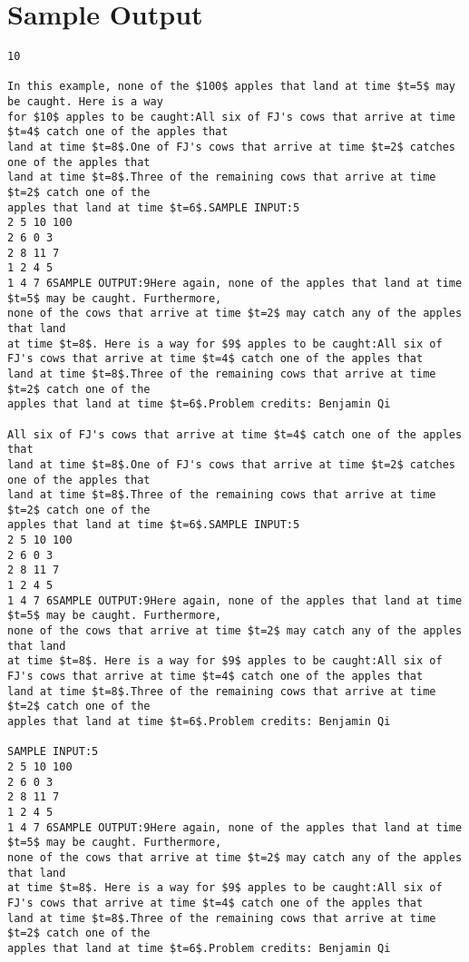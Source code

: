 \documentclass[12pt]{article}
\begin{document}
\section*{Sample Output}
\begin{verbatim}
10

In this example, none of the $100$ apples that land at time $t=5$ may be caught. Here is a way
for $10$ apples to be caught:All six of FJ's cows that arrive at time $t=4$ catch one of the apples that
land at time $t=8$.One of FJ's cows that arrive at time $t=2$ catches one of the apples that
land at time $t=8$.Three of the remaining cows that arrive at time $t=2$ catch one of the
apples that land at time $t=6$.SAMPLE INPUT:5
2 5 10 100
2 6 0 3
2 8 11 7
1 2 4 5
1 4 7 6SAMPLE OUTPUT:9Here again, none of the apples that land at time $t=5$ may be caught. Furthermore,
none of the cows that arrive at time $t=2$ may catch any of the apples that land
at time $t=8$. Here is a way for $9$ apples to be caught:All six of FJ's cows that arrive at time $t=4$ catch one of the apples that
land at time $t=8$.Three of the remaining cows that arrive at time $t=2$ catch one of the
apples that land at time $t=6$.Problem credits: Benjamin Qi

All six of FJ's cows that arrive at time $t=4$ catch one of the apples that
land at time $t=8$.One of FJ's cows that arrive at time $t=2$ catches one of the apples that
land at time $t=8$.Three of the remaining cows that arrive at time $t=2$ catch one of the
apples that land at time $t=6$.SAMPLE INPUT:5
2 5 10 100
2 6 0 3
2 8 11 7
1 2 4 5
1 4 7 6SAMPLE OUTPUT:9Here again, none of the apples that land at time $t=5$ may be caught. Furthermore,
none of the cows that arrive at time $t=2$ may catch any of the apples that land
at time $t=8$. Here is a way for $9$ apples to be caught:All six of FJ's cows that arrive at time $t=4$ catch one of the apples that
land at time $t=8$.Three of the remaining cows that arrive at time $t=2$ catch one of the
apples that land at time $t=6$.Problem credits: Benjamin Qi

SAMPLE INPUT:5
2 5 10 100
2 6 0 3
2 8 11 7
1 2 4 5
1 4 7 6SAMPLE OUTPUT:9Here again, none of the apples that land at time $t=5$ may be caught. Furthermore,
none of the cows that arrive at time $t=2$ may catch any of the apples that land
at time $t=8$. Here is a way for $9$ apples to be caught:All six of FJ's cows that arrive at time $t=4$ catch one of the apples that
land at time $t=8$.Three of the remaining cows that arrive at time $t=2$ catch one of the
apples that land at time $t=6$.Problem credits: Benjamin Qi


\end{verbatim}
\end{document}
